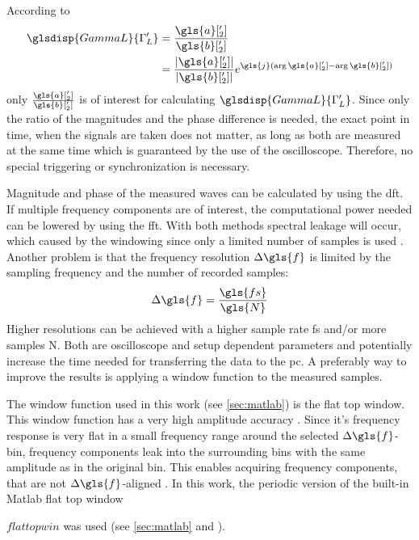 \documentclass[12pt,a4paper,parskip=full,abstract=true,BCOR=12mm]{scrreprt}
\providecommand{\abs}[1]{\lvert#1\rvert}
\newcommand*{\SavedLstInline}{}
\DeclareRobustCommand*{\lstinline}{%
  \ifmmode
    \let\SavedBGroup\bgroup
    \def\bgroup{%
      \let\bgroup\SavedBGroup
      \hbox\bgroup
    }%
  \fi
  \SavedLstInline
}
\begin{document}
According to
\begin{equation}\label{eq:gl_phase}
    \begin{split}
        \glsdisp{GammaL}{\Gamma'_L} & = \frac{\gls{a}['_2]}{\gls{b}['_2]} \\
                     & = \frac{\abs{\gls{a}['_2]}}{\abs{\gls{b}['_2]}} e^{\gls{j}(\arg{\gls{a}['_2]}-\arg{\gls{b}['_2]})}
    \end{split}
\end{equation}
only $\frac{\gls{a}['_2]}{\gls{b}['_2]}$ is
of interest for calculating $\glsdisp{GammaL}{\Gamma'_L}$. Since only the ratio of the magnitudes
and the phase difference is needed, the exact point in time, when the signals are
taken does not matter, as long as both are measured at the same time which is guaranteed
by the use of the oscilloscope. Therefore, no special triggering or synchronization is necessary.

Magnitude and phase of the measured waves can be calculated by using
the \gls{dft}. If multiple frequency components are of interest, the computational
power needed can be lowered by using the \gls{fft}. With both methods
spectral leakage will occur, which caused by the windowing since only a limited number of samples is used \cite{harris_use_1978}.
Another problem is that the frequency resolution $\Delta{}\gls{f}$ is limited by the sampling
frequency and the number of recorded samples:
\begin{equation}
    \label{eq:fres} \Delta{}\gls{f} = \frac{\gls{fs}}{\gls{N}}
\end{equation}
Higher resolutions
can be achieved with a higher sample rate \gls{fs} and/or more samples \gls{N}. Both are oscilloscope and setup
dependent parameters and potentially increase the time needed for transferring the data to the
\gls{pc}. A preferably way to improve the results is applying a window function to the
measured samples.

The window function used in this work (see \cref{sec:matlab}) is the flat top window.
This window function has a very high amplitude accuracy \cite{heinzel_spectrum_2002}.
Since it's frequency response is very flat in a small frequency range around the selected $\Delta{}\gls{f}$-bin, frequency components leak
into the surrounding bins with the same amplitude as in the original bin. This enables acquiring frequency components, that are not $\Delta{}\gls{f}$-aligned \cite{heinzel_spectrum_2002}.
In this work, the periodic version of the built-in Matlab flat top window \lstinline$flattopwin$
was used (see \cref{sec:matlab} and \cite{matlab_flattop}).
\end{document}
